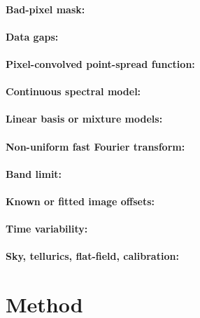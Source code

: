 \documentclass[11pt]{article}
\begin{document}
\paragraph{Bad-pixel mask:}

\paragraph{Data gaps:}

\paragraph{Pixel-convolved point-spread function:}

\paragraph{Continuous spectral model:}

\paragraph{Linear basis or mixture models:}

\paragraph{Non-uniform fast Fourier transform:}

\paragraph{Band limit:}

\paragraph{Known or fitted image offsets:}

\paragraph{Time variability:}

\paragraph{Sky, tellurics, flat-field, calibration:}

\section{Method}
\end{document}
